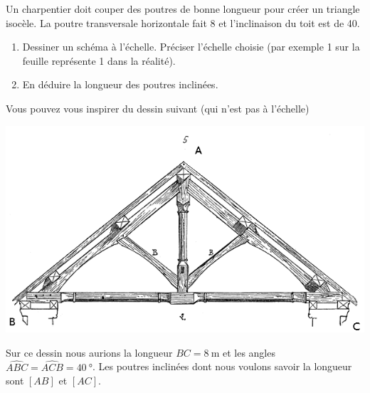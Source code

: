 
\begin{exercice}\label{exosmath-0824}

    Un charpentier doit couper des poutres de bonne longueur pour créer un triangle isocèle. La poutre transversale horizontale fait \unit{8}{\meter} et l'inclinaison du toit est de \unit{40}{\degree}. 
    \begin{enumerate}
        \item
            Dessiner un schéma à l'échelle. Préciser l'échelle choisie (par exemple \unit{1}{\centi\meter} sur la feuille représente \unit{1}{\meter} dans la réalité).
        \item
            En déduire la longueur des poutres inclinées.
    \end{enumerate}

    Vous pouvez vous inspirer du dessin suivant\cite{EKNooAsTWza} (qui n'est pas à l'échelle)
    \begin{center}
    \includegraphics[width=0.7\linewidth]{Charpenteetjambettes2.png}
    \end{center}
    Sur ce dessin nous aurions la longueur \( BC=\SI{8}{\meter}\) et les angles \( \widehat{ABC}=\widehat{ACB}=\SI{40}{\degree}\). Les poutres inclinées dont nous voulons savoir la longueur sont \( [AB]\) et \( [AC]\).
    
\end{exercice}
